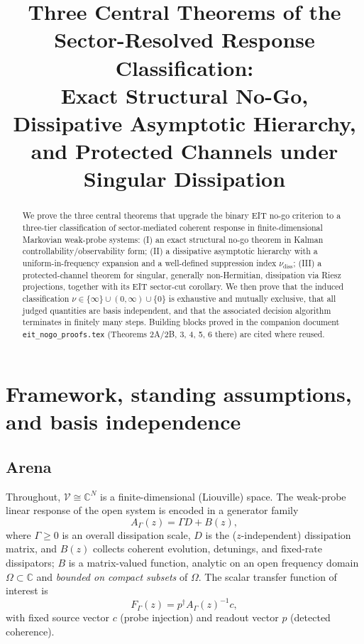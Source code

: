 \documentclass[11pt]{article}
\title{Three Central Theorems of the Sector-Resolved Response Classification:\\
Exact Structural No-Go, Dissipative Asymptotic Hierarchy,\\
and Protected Channels under Singular Dissipation}
\author{}
\date{}
\newcommand{\nudiss}{\nu_{\mathrm{diss}}}
\begin{document}
\maketitle

\begin{abstract}
We prove the three central theorems that upgrade the binary EIT no-go criterion
to a three-tier classification of sector-mediated coherent response in
finite-dimensional Markovian weak-probe systems: (I) an exact structural no-go
theorem in Kalman controllability/observability form; (II) a dissipative
asymptotic hierarchy with a uniform-in-frequency expansion and a well-defined
suppression index $\nudiss$; (III) a protected-channel theorem for singular,
generally non-Hermitian, dissipation via Riesz projections, together with its
EIT sector-cut corollary. We then prove that the induced classification
$\nu\in\{\infty\}\cup(0,\infty)\cup\{0\}$ is exhaustive and mutually exclusive,
that all judged quantities are basis independent, and that the associated
decision algorithm terminates in finitely many steps. Building blocks proved in
the companion document \texttt{eit\_nogo\_proofs.tex} (Theorems 2A/2B, 3, 4, 5,
6 there) are cited where reused.
\end{abstract}

\section{Framework, standing assumptions, and basis independence}

\subsection{Arena}

Throughout, $\mathcal V\cong\mathbb C^{N}$ is a finite-dimensional (Liouville)
space. The weak-probe linear response of the open system is encoded in a
generator family
\begin{equation}
A_\Gamma(z)=\Gamma D+B(z),
\label{eq:AGamma}
\end{equation}
where $\Gamma\ge0$ is an overall dissipation scale, $D$ is the ($z$-independent)
dissipation matrix, and $B(z)$ collects coherent evolution, detunings, and
fixed-rate dissipators; $B$ is a matrix-valued function, analytic on an open
frequency domain $\Omega\subset\mathbb C$ and \emph{bounded on compact subsets}
of $\Omega$. The scalar transfer function of interest is
\begin{equation}
F_\Gamma(z)=p^\dagger A_\Gamma(z)^{-1}c ,
\label{eq:transfer}
\end{equation}
with fixed source vector $c$ (probe injection) and readout vector $p$
(detected coherence).
\end{document}
